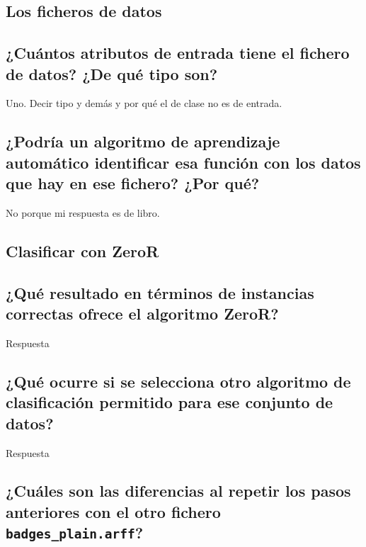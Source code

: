 \documentclass[12pt]{article}
\begin{document}
\tableofcontents

\newpage

\begin{center}
\section{Los ficheros de datos}
\end{center}

\subsection{¿Cuántos atributos de entrada tiene el fichero de datos?
¿De qué tipo son?}

Uno. Decir tipo y demás y por qué el de clase no es de entrada.

\subsection{¿Podría un algoritmo de aprendizaje automático identificar esa
función con los datos que hay en ese fichero? ¿Por qué?}

No porque mi respuesta es de libro.

\newpage

\begin{center}
\section{Clasificar con ZeroR}
\end{center}

\subsection{¿Qué resultado en términos de instancias correctas ofrece el algoritmo
ZeroR?}

Respuesta

\subsection{¿Qué ocurre si se selecciona otro algoritmo de clasificación permitido
para ese conjunto de datos?}

Respuesta

\subsection{¿Cuáles son las diferencias al repetir los pasos anteriores con el otro
fichero \texttt{badges\_plain.arff}?}
\end{document}
